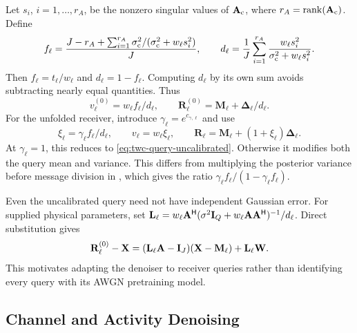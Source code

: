 Let $s_i$, $i=1,\ldots,r_A$, be the nonzero singular values of
$\mathbf A_{\rm c}$, where $r_A=\operatorname{rank}(\mathbf A_{\rm c})$.
Define
\begin{equation}
 f_\ell=\frac{J-r_A+\sum_{i=1}^{r_A}
 \sigma_{\rm c}^2/(\sigma_{\rm c}^2+w_\ell s_i^2)}{J},\qquad
 d_\ell=\frac1J\sum_{i=1}^{r_A}
 \frac{w_\ell s_i^2}{\sigma_{\rm c}^2+w_\ell s_i^2}.
 \label{eq:twc-linear-fractions}
\end{equation}
Then $f_\ell=t_\ell/w_\ell$ and $d_\ell=1-f_\ell$. Computing $d_\ell$
by its own sum avoids subtracting nearly equal quantities. Thus
\begin{equation}
 v_\ell^{(0)}=w_\ell f_\ell/d_\ell,\qquad
 \mathbf R_\ell^{(0)}=\mathbf M_\ell+\bm\Delta_\ell/d_\ell.
 \label{eq:twc-query-uncalibrated}
\end{equation}
For the unfolded receiver, introduce $\gamma_\ell=e^{c_{\gamma,\ell}}$
and use
\begin{equation}
 \xi_\ell=\gamma_\ell f_\ell/d_\ell,\qquad
 v_\ell=w_\ell\xi_\ell,\qquad
 \mathbf R_\ell=\mathbf M_\ell+(1+\xi_\ell)\bm\Delta_\ell.
 \label{eq:twc-query-calibrated}
\end{equation}
At $\gamma_\ell=1$, this reduces to \eqref{eq:twc-query-uncalibrated}.
Otherwise it modifies both the query mean and variance. This differs
from multiplying the posterior variance before message division in
\cite[eqs.~(8)--(10)]{wei2026}, which gives the ratio
$\gamma_\ell f_\ell/(1-\gamma_\ell f_\ell)$.

Even the uncalibrated query need not have independent Gaussian error.
For supplied physical parameters, set
$\mathbf L_\ell=w_\ell\mathbf A^{\mathsf H}
(\sigma^2\mathbf{I}_Q+w_\ell\mathbf A\mathbf A^{\mathsf H})^{-1}/d_\ell$.
Direct substitution gives
\begin{equation}
 \mathbf R_\ell^{(0)}-\mathbf X
 =(\mathbf L_\ell\mathbf A-\mathbf{I}_J)(\mathbf X-\mathbf M_\ell)
 +\mathbf L_\ell\mathbf W.
 \label{eq:twc-query-error}
\end{equation}
This motivates adapting the denoiser to receiver queries rather than
identifying every query with its AWGN pretraining model.

\subsection{Channel and Activity Denoising}

